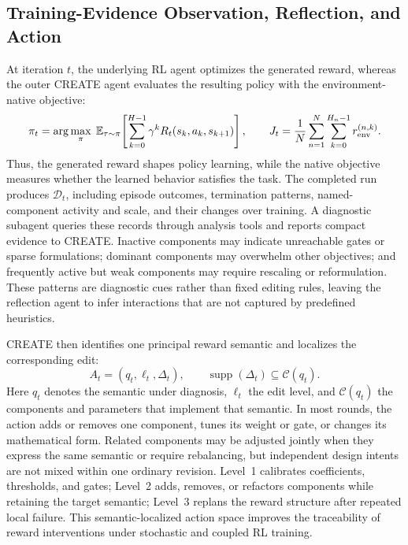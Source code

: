 \subsection{Training-Evidence Observation, Reflection, and Action}
At iteration $t$, the underlying RL agent optimizes the generated reward, whereas the outer CREATE agent evaluates the resulting policy with the environment-native objective:
\begin{equation}
\pi_t=\arg\max_{\pi}\;\mathbb E_{\tau\sim\pi}\!\left[\sum_{k=0}^{H-1}\gamma^kR_t(s_k,a_k,s_{k+1})\right],\qquad
J_t=\frac{1}{N}\sum_{n=1}^{N}\sum_{k=0}^{H_n-1}r_{\rm env}^{(n,k)}.
\label{eq:train_eval}
\end{equation}
Thus, the generated reward shapes policy learning, while the native objective measures whether the learned behavior satisfies the task. The completed run produces $\mathcal D_t$, including episode outcomes, termination patterns, named-component activity and scale, and their changes over training. A diagnostic subagent queries these records through analysis tools and reports compact evidence to CREATE. Inactive components may indicate unreachable gates or sparse formulations; dominant components may overwhelm other objectives; and frequently active but weak components may require rescaling or reformulation. These patterns are diagnostic cues rather than fixed editing rules, leaving the reflection agent to infer interactions that are not captured by predefined heuristics.

CREATE then identifies one principal reward semantic and localizes the corresponding edit:
\begin{equation}
A_t=(q_t,\ell_t,\Delta_t),\qquad
\operatorname{supp}(\Delta_t)\subseteq\mathcal C(q_t).
\label{eq:semantic_edit}
\end{equation}
Here $q_t$ denotes the semantic under diagnosis, $\ell_t$ the edit level, and $\mathcal C(q_t)$ the components and parameters that implement that semantic. In most rounds, the action adds or removes one component, tunes its weight or gate, or changes its mathematical form. Related components may be adjusted jointly when they express the same semantic or require rebalancing, but independent design intents are not mixed within one ordinary revision. Level~1 calibrates coefficients, thresholds, and gates; Level~2 adds, removes, or refactors components while retaining the target semantic; Level~3 replans the reward structure after repeated local failure. This semantic-localized action space improves the traceability of reward interventions under stochastic and coupled RL training.

